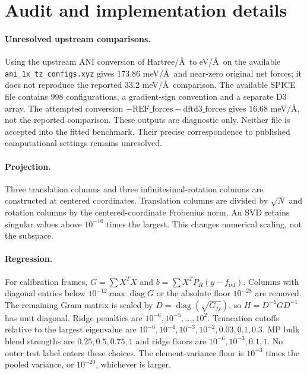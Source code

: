 \documentclass[11pt]{article}
\begin{document}
\appendix
\section{Audit and implementation details}
\paragraph{Unresolved upstream comparisons.}
Using the upstream ANI conversion of Hartree/\AA\ to eV/\AA\ on the available
\texttt{ani\_1x\_tz\_configs.xyz} gives 173.86 meV/\AA\ and near-zero original net
forces; it does not reproduce the reported 33.2 meV/\AA\ comparison. The available
SPICE file contains 998 configurations, a gradient-sign convention and a separate
D3 array. The attempted conversion $-\mathrm{REF\_forces}-\mathrm{dftd3\_forces}$
gives 16.68 meV/\AA, not the reported comparison. These outputs are diagnostic only.
Neither file is accepted into the fitted benchmark. Their precise correspondence
to published computational settings remains unresolved.

\paragraph{Projection.}
Three translation columns and three infinitesimal-rotation columns are constructed
at centered coordinates. Translation columns are divided by $\sqrt N$ and rotation
columns by the centered-coordinate Frobenius norm. An SVD retains singular values
above $10^{-10}$ times the largest. This changes numerical scaling, not the subspace.

\paragraph{Regression.}
For calibration frames, $G=\sum X^TX$ and $b=\sum X^TP_R(y-f_{\mathrm{ref}})$.
Columns with diagonal entries below $10^{-12}\max\operatorname{diag}G$ or the
absolute floor $10^{-28}$ are removed. The remaining Gram matrix is scaled by
$D=\operatorname{diag}(\sqrt{G_{jj}})$, so $H=D^{-1}GD^{-1}$ has unit diagonal.
Ridge penalties are $10^{-6},10^{-5},\ldots,10^2$. Truncation cutoffs relative to
the largest eigenvalue are $10^{-6},10^{-4},10^{-3},10^{-2},0.03,0.1,0.3$.
MP bulk blend strengths are $0.25,0.5,0.75,1$ and ridge floors are
$10^{-6},10^{-3},0.1,1$. No outer test label enters these choices. The
element-variance floor is $10^{-3}$ times the pooled variance, or $10^{-20}$,
whichever is larger.
\end{document}
